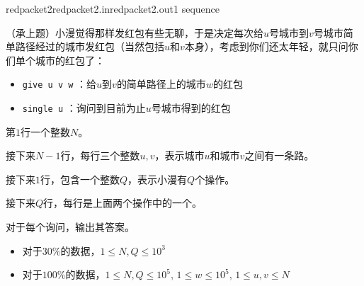 \documentclass[11pt,a4paper,oneside]{article}
\begin{document}
\begin{problem}{redpacket2}{redpacket2.in}{redpacket2.out}{1 sequence}

    （承上题）小漫觉得那样发红包有些无聊，于是决定每次给$u$号城市到$v$号城市简单路径经过的城市发红包（当然包括$u$和$v$本身），考虑到你们还太年轻，就只问你们单个城市的红包了：
    \begin{itemize}
    	\item \texttt{give u v w} ：给$u$到$v$的简单路径上的城市$w$的红包
    	\item \texttt{single u} ：询问到目前为止$u$号城市得到的红包
    \end{itemize}

    \InputFile
	
		第$1$行一个整数$N$。
		
		接下来$N-1$行，每行三个整数$u, v$，表示城市$u$和城市$v$之间有一条路。
		
		接下来$1$行，包含一个整数$Q$，表示小漫有$Q$个操作。
		
		接下来$Q$行，每行是上面两个操作中的一个。
    
    \OutputFile

	对于每个询问，输出其答案。

    \Example

    \begin{example}
    \end{example}

    \Note
    \begin{itemize}
        \item 对于$30\%$的数据，$1 \leq N,  Q \leq 10^3$
        \item 对于$100\%$的数据，$1 \leq N, Q \leq 10^5$, $1 \leq w \leq 10^5$, $1 \leq u, v \leq N$
    \end{itemize}

\end{problem}
\end{document}
